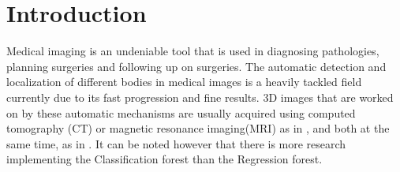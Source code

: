 \chapter{Introduction}
\label{chap:One}


Medical imaging is an undeniable tool that is used in diagnosing pathologies, planning surgeries and following up on surgeries. The automatic detection and localization of different bodies in medical images is a heavily tackled field currently due to its fast progression and fine results. 3D images that are worked on by these automatic mechanisms are usually acquired using computed tomography (CT) or magnetic resonance imaging(MRI) as in \cite{citeKey3}, and both at the same time, as in \cite{citeKey4}. It can be noted however that there is more research implementing the Classification forest than the Regression forest.
